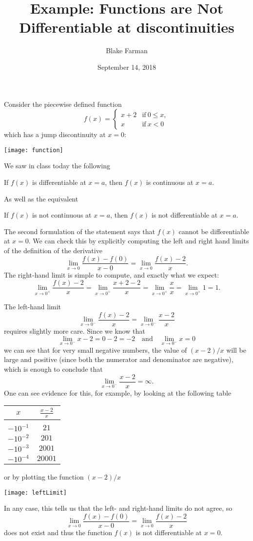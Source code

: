\documentclass[10pt]{amsart}
\title[Example]{Example: Functions are Not Differentiable at discontinuities}
\date{September 14, 2018}
\author{Blake Farman}
\begin{document}
\maketitle

Consider the piecewise defined function
\[f(x) = \left\{\begin{array}{cc}x + 2 & \text{if}\ 0 \leq x,
\\x & \text{if}\ x < 0\end{array} \right.\]
which has a jump discontinuity at \(x = 0\):
\begin{center}
  \texttt{[image: function]}
\end{center}

We saw in class today the following
\begin{thm}
  If \(f(x)\) is differentiable at \(x = a\), then \(f(x)\) is continuous at \(x = a\).
\end{thm}
As well as the equivalent 
\begin{thm}
  If \(f(x)\) is not continuous at \(x = a\), then \(f(x)\) is not differentiable at \(x = a\).
\end{thm}
The second formulation of the statement says that \(f(x)\) cannot be differentiable at \(x = 0\).
We can check this by explicitly computing the left and right hand limits of the definition of the derivative
\[\lim_{x \to 0} \frac{f(x) - f(0)}{x - 0} = \lim_{x \to 0} \frac{f(x) - 2}{x}.\]
The right-hand limit is simple to compute, and exactly what we expect:
\[\lim_{x \to 0^+} \frac{f(x) - 2}{x} = \lim_{x \to 0^+} \frac{x + 2 - 2}{x} = \lim_{x \to 0^+} \frac{x}{x} = \lim_{x \to 0^+} 1 = 1.\]

The left-hand limit
\[\lim_{x \to 0^-} \frac{f(x) - 2}{x} = \lim_{x \to 0^-} \frac{x - 2}{x}\]
requires slightly more care.
Since we know that
\[\lim_{x \to 0^-} x - 2 = 0 - 2 = -2\quad \text{and}\quad \lim_{x \to 0^-} x = 0\]
we can see that for very small negative numbers, the value of \((x - 2)/x\) will be large and positive (since both the numerator and denominator are negative), which is enough to conclude that
\[\lim_{x \to 0^-} \frac{x - 2}{x} = \infty.\]
One can see evidence for this, for example, by looking at the following table
\begin{center}
  \begin{tabular}{c|c}
    \(x\) & \(\displaystyle{\frac{x - 2}{x}}\)\\
    \hline\\
    \(\displaystyle{-10^{-1}}\) & \(21\)\\
    \(\displaystyle{-10^{-2}}\) & \(201\)\\
    \(\displaystyle{-10^{-3}}\) & \(2001\)\\
    \(\displaystyle{-10^{-4}}\) & \(20001\)
  \end{tabular}
\end{center}
or by plotting the function \((x-2)/x\)
\begin{center}
  \texttt{[image: leftLimit]}
\end{center}
In any case, this tells us that the left- and right-hand limits do not agree, so
\[\lim_{x \to 0} \frac{f(x) - f(0)}{x - 0} = \lim_{x \to 0} \frac{f(x) - 2}{x}\]
does not exist and thus the function \(f(x)\) is not differentiable at \(x = 0\).
\end{document}
